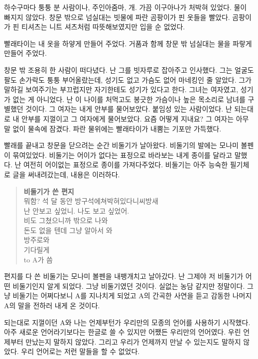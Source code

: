 \documentclass[a5paper,10pt, twoside, openright]{memoir}
\begin{document}
	하수구마다 퉁퉁 분 사람이나, 주인아줌마, 개. 가끔 이구아나가 처박혀 있었다. 물이 빠지지 않았다. 창문 밖으로 넘실대는 빗물에 파란 곰팡이가 핀 옷들을 빨았다. 곰팡이가 핀 티셔츠는 니트 셔츠처럼 따뜻해보였지만 입을 순 없었다. 
	
	빨래타이는 내 옷을 하얗게 만들어 주었다. 거품과 함께 창문 밖 넘실대는 물을 파랗게 만들어 주었다. 
	
	창문 밖 조용히 한 사람이 떠다녔다. 난 그를 빗자루로 잡아주고 인사했다. 그는 얼굴도 팔도 손가락도 퉁퉁 부어올랐는데, 성기도 없고 가슴도 없어 마네킹인 줄 알았다. 그가 말하길 보여주기는 부끄럽지만 자기한테도 성기가 있다고 한다. 그녀는 여자였고, 성기가 없는 게 아니었다. 난 이 나이를 처먹고도 봉긋한 가슴이나 높은 목소리로 남녀를 구별했던 것이다. 그 여자는 내게 안부를 물어보았다. 붙임성 있는 사람이었다. 난 되는대로 내 안부를 지껄이고 그 여자에게 물어보았다. 요즘 어떻게 지내요? 그 여자는 아무 말 없이 물속에 잠겼다. 파란 물위에는 빨래타이가 내뿜는 기포만 가득했다.

	빨래를 끝내고 창문을 닫으려는 순간 비둘기가 날아왔다. 비둘기의 발에는 모나미 볼펜이 묶여있었다. 비둘기는 어이가 없다는 표정으로 바라보는 내게 종이를 달라고 말했다. 난 여전히 어이없는 표정으로 종이를 가져다주었다. 비둘기는 아주 능숙한 필기체로 글을 써내려갔는데, 내용은 이러하다. 

					\begin{quote}
						\textbf{비둘기가 쓴 편지}\\
						뭐함? 석 달 동안 방구석에쳐박혀있다니씨방새\\
						난 안보고 싶었니. 나도 보고 싶었어.\\
						비도 그쳤으니까 밖으로 나와\\
						돈도 없을 텐데 그냥 알아서 와\\
						방주로와\\
						기다릴게\\
						to A가 씀
					\end{quote}

	편지를 다 쓴 비둘기는 모나미 볼펜을 내팽개치고 날아갔다. 난 그제야 저 비둘기가 어떤 비둘기인지 알게 되었다. 그냥 비둘기였던 것이다. 실없는 농담 같지만 정말이다. 그냥 비둘기는 어쩌다보니 A를 지나치게 되었고 A의 간곡한 사연을 듣고 감동한 나머지 A의 말을 전하러 내게 온 것이다. 

	되는대로 지껄이던 A와 나는 언제부턴가 우리만의 모종의 언어를 사용하기 시작했다. 아주 새로운 언어라기보다는 한글로 쓸 수 있지만 어쨌든 우리만의 언어였다. 우린 언제부터 만났는지 말하지 않았다. 그리고 우리가 언제까지 만날 수 있는지도 말하지 않았다. 우리 언어로는 저런 말들을 할 수 없었다. 
	
\end{document}
